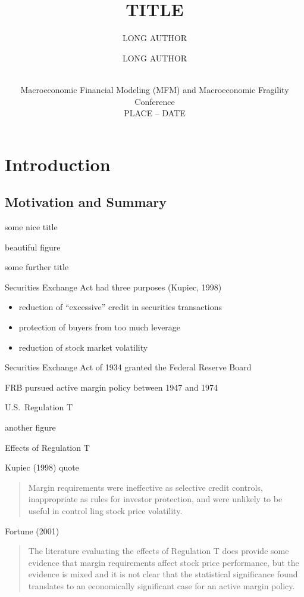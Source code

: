 \documentclass[large]{beamer}
\title[SHORT TITLE]{TITLE}
\author[SHORT AUTHORS] %
{
	LONG AUTHOR\inst{1} \and 
	LONG AUTHOR\inst{2}}
\institute[] %
{
  \inst{1} UNIVERSITY \and 
  \inst{2} UNIVERSITY %
}
\date[MFM 2017] %
{ \\[5pt]
Macroeconomic Financial Modeling (MFM) and Macroeconomic Fragility Conference \\[5pt]
PLACE -- DATE}
\begin{document}
\begin{frame}
  \titlepage
\end{frame}

\section{Introduction}
%
\subsection{Motivation and Summary}
%
\begin{frame}{some nice title}

beautiful figure 

\end{frame}
%
\begin{frame}{some further title}

Securities Exchange Act had three purposes (Kupiec, 1998)
\begin{itemize}
\item reduction of ``excessive'' credit in securities transactions
\item protection of buyers from too much leverage
\item reduction of stock market volatility
\end{itemize}

\bigskip

Securities Exchange Act of 1934 granted the Federal Reserve Board\\

\bigskip

FRB pursued active margin policy between 1947 and 1974

\end{frame}
%
\begin{frame}{U.S.\ Regulation T}

another figure 

\end{frame}
%
\begin{frame}{Effects of Regulation T}

Kupiec (1998) quote\\

\begin{quote}
{ Margin requirements were ineffective as selective credit controls, inappropriate as rules for investor protection, and were unlikely to be useful in control\-
ling stock price volatility.}
\end{quote}

\bigskip

Fortune (2001)\\

\begin{quote}
{The literature evaluating the effects of Regulation T does provide some evidence that margin requirements affect stock price performance, but the evidence is mixed and it is not clear that the statistical significance found trans\-lates to an economically significant case for an active margin policy.}
\end{quote}

\end{frame}
\end{document}
